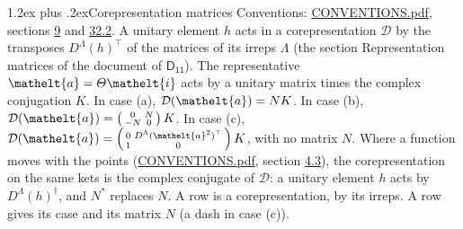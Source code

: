 \documentclass[10pt,a4paper]{article}
\makeatletter
\renewcommand\section{\@startsection{section}{1}{\z@}{-3ex plus -1ex minus -.2ex}%
  {1.2ex plus .2ex}{\normalfont\large\sffamily\bfseries\color{parttitle}}}
\numberwithin{equation}{section}
\newcommand{\eltfont}[1]{{\let\sigma\eltsigma\mathelt{#1}}}
\newcommand{\grp}[1]{\mathsf{#1}}
\newcommand{\elt}[1]{\eltfont{#1}}
\makeatother
\begin{document}
\section{Corepresentation matrices}\label{s:corep_matrices}
Conventions: \href{../../CONVENTIONS.pdf}{CONVENTIONS.pdf}, sections \href{../../../rotation/CONVENTIONS.pdf\#conv.9}{9} and \href{../../CONVENTIONS.pdf\#conv.32.2}{32.2}.
A unitary element $h$ acts in a corepresentation $\mathcal{D}$ by the transposes $D^{\Lambda}(h)^{\top}$ of the matrices of its irreps $\Lambda$ (the section Representation matrices of the document of \href{../../../rotation/data/pdf/D11.pdf}{$\grp{D_{11}}$}). The representative $\elt{a} = \varTheta\elt{i}$ acts by a unitary matrix times the complex conjugation $K$.
In case (a), $\mathcal{D}(\elt{a}) = NK$. In case (b), $\mathcal{D}(\elt{a}) = \left(\begin{smallmatrix} 0 & N \\ -N & 0 \end{smallmatrix}\right) K$. In case (c), $\mathcal{D}(\elt{a}) = \left(\begin{smallmatrix} 0 & D^{\Lambda}(\elt{a}^2)^{\top} \\ 1 & 0 \end{smallmatrix}\right) K$, with no matrix $N$.
Where a function moves with the points (\href{../../CONVENTIONS.pdf}{CONVENTIONS.pdf}, section \href{../../../rotation/CONVENTIONS.pdf\#conv.4.3}{4.3}), the corepresentation on the same kets is the complex conjugate of $\mathcal{D}$: a unitary element $h$ acts by $D^{\Lambda}(h)^{\dagger}$, and $N^{*}$ replaces $N$.
A row is a corepresentation, by its irreps. A row gives its case and its matrix $N$ (a dash in case (c)).
\end{document}
